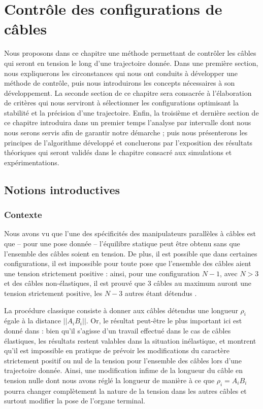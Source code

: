 \chapter{Contr\^ole des configurations de c\^ables}

Nous proposons dans ce chapitre une m\'ethode permettant de contr\^oler les
c\^ables qui seront en tension le long d'une trajectoire donn\'ee. Dans une
premi\`ere section, nous expliquerons les circonstances qui nous ont
conduits \`a d\'evelopper une m\'ethode de contr\^ole, puis nous introduirons
les concepts n\'ecessaires \`a son d\'eveloppement. La seconde section de ce
chapitre sera consacr\'ee \`a l'\'elaboration de crit\`eres qui nous serviront
\`a s\'electionner les configurations optimisant la stabilit\'e et la
pr\'ecision d'une trajectoire. Enfin, la troisi\`eme et derni\`ere section de
ce chapitre introduira dans un premier temps l'analyse par intervalle dont nous
nous serons servis afin de garantir notre d\'emarche ; puis nous pr\'esenterons
les principes de l'algorithme d\'evelopp\'e et concluerons par l'exposition des
r\'esultats th\'eoriques qui seront valid\'es dans le chapitre consacr\'e aux
simulations et exp\'eri\-mentations.

\section{Notions introductives}

\subsection{Contexte}

Nous avons vu que l'une des sp\'ecificit\'es des manipulateurs parall\`eles \`a
c\^ables est que -- pour une pose donn\'ee -- l'\'equilibre statique peut
\^etre obtenu sans que l'ensemble des c\^ables soient en tension. De plus, il
est possible que dans certaines configurations, il est impossible pour toute
pose que l'ensemble des c\^ables aient une tension strictement positive : ainsi,
pour une configuration $N-1$, avec $N> 3$ et des c\^ables non-\'elastiques, il
est prouv\'e que 3 c\^ables au maximum auront une tension strictement positive,
les $N-3$ autres \'etant d\'etendus \cite{merlet2012}.

La proc\'edure classique consiste \`a donner aux c\^ables d\'etendus une
longueur $\rho_i$ \'egale \`a la distance $||A_iB_i||$. Or, le r\'esultat
peut-\^etre le plus important ici est donn\'e dans \cite{merlet2014} : bien
qu'il s'agisse d'un travail effectu\'e dans le cas de c\^ables \'elastiques,
les r\'esultats restent valables dans la situation in\'elastique, et montrent
qu'il est impossible en pratique de pr\'evoir les modifications du caract\`ere
strictement positif ou nul de la tension pour l'ensemble des c\^ables lors d'une
trajectoire donn\'ee. Ainsi, une modification infime de la longueur du c\^able
en tension nulle dont nous avons r\'egl\'e la longueur de mani\`ere \`a ce que
$\rho_i = A_iB_i$ pourra changer compl\`etement la nature de la tension dans
les autres c\^ables et surtout modifier la pose de l'organe terminal.

